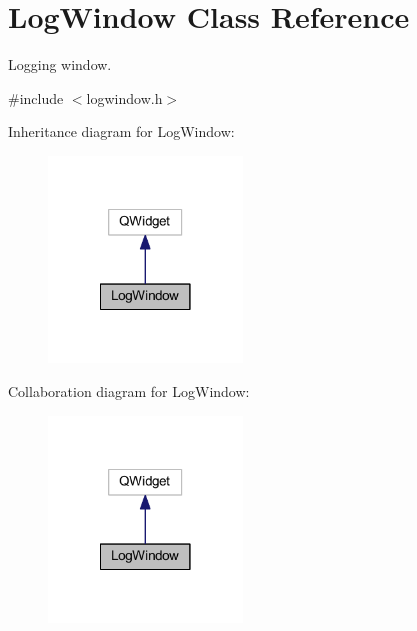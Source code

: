 \hypertarget{class_log_window}{\section{Log\-Window Class Reference}
\label{class_log_window}
}


Logging window.  




{\ttfamily \#include $<$logwindow.\-h$>$}



Inheritance diagram for Log\-Window\-:
\nopagebreak
\begin{figure}[H]
\begin{center}
\leavevmode
\includegraphics[width=146pt]{class_log_window__inherit__graph}
\end{center}
\end{figure}


Collaboration diagram for Log\-Window\-:
\nopagebreak
\begin{figure}[H]
\begin{center}
\leavevmode
\includegraphics[width=146pt]{class_log_window__coll__graph}
\end{center}
\end{figure}
